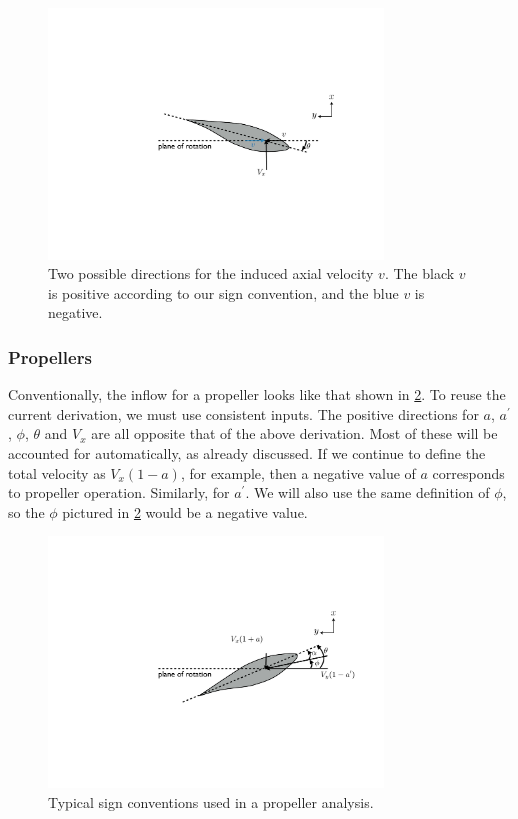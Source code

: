 \documentclass{article}
\begin{document}
\begin{figure}[htbp]
\centering
\includegraphics[width=3.5in]{figures/inflow5}
\caption{Two possible directions for the induced axial velocity $v$.  The black $v$ is positive according to our sign convention, and the blue $v$ is negative.}
\label{fig:inflowv}
\end{figure}

\subsubsection{Propellers}

Conventionally, the inflow for a propeller looks like that shown in \cref{fig:inflowprop}.  To reuse the current derivation, we must use consistent inputs.  The positive directions for $a$, $a^\prime$, $\phi$, $\theta$ and $V_x$ are all opposite that of the above derivation.  Most of these will be accounted for automatically, as already discussed.  If we continue to define the total velocity as $V_x (1 - a)$, for example, then a negative value of $a$ corresponds to propeller operation.  Similarly, for $a^\prime$.  We will also use the same definition of $\phi$, so the $\phi$ pictured in \cref{fig:inflowprop} would be a negative value.

\begin{figure}[htbp]
\centering
\includegraphics[width=3.5in]{figures/inflowprop}
\caption{Typical sign conventions used in a propeller analysis.}
\label{fig:inflowprop}
\end{figure}
\end{document}
